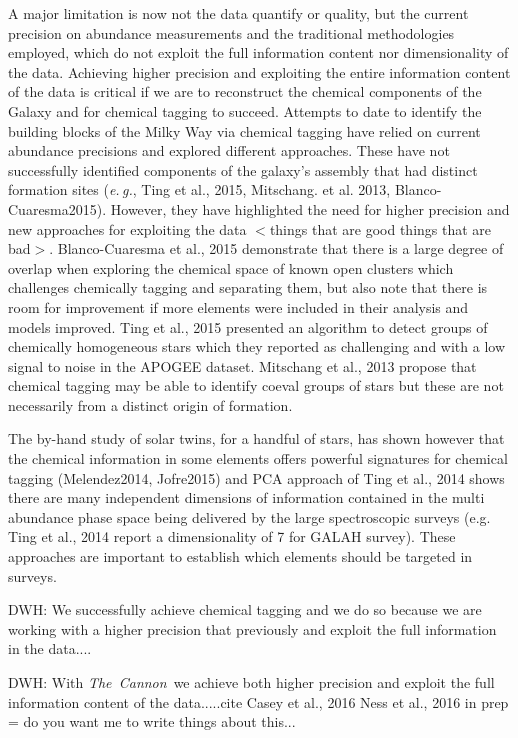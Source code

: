 \documentclass[12pt, letterpaper, preprint]{aastex}
\newcommand{\project}[1]{\textsl{#1}}
\newcommand{\thecannon}{\project{The~Cannon}}
\newcommand{\foreign}[1]{\textsl{#1}}
\newcommand{\eg}{\foreign{e.\,g.}}
\begin{document}
A major limitation is now not the data quantify or quality, but the
current precision on abundance measurements \citep[\eg,][]{Ting2015,
  Martel2015} and the traditional methodologies employed, which do not
exploit the full information content nor dimensionality of the
data.
Achieving higher precision and exploiting the entire information
content of the data is critical if we are to reconstruct the chemical
components of the Galaxy and for chemical tagging to succeed.
Attempts to date to identify the building blocks of the Milky Way via
chemical tagging have relied on current abundance precisions and
explored different approaches.
These have not successfully identified components of the galaxy's
assembly that had distinct formation sites (\eg, Ting et al., 2015, Mitschang. et al. 2013,
Blanco-Cuaresma2015).
However, they have highlighted the need for higher precision and new
approaches for exploiting the data $<$things that are good things that
are bad$>$.
Blanco-Cuaresma et al., 2015 demonstrate that there is a large degree
of overlap when exploring the chemical space of known open clusters
which challenges chemically tagging and separating them, but also note
that there is room for improvement if more elements were included in
their analysis and models improved.
Ting et al., 2015 presented an algorithm to detect groups of
chemically homogeneous stars which they reported as challenging and
with a low signal to noise in the APOGEE dataset.
Mitschang et al., 2013 propose that chemical tagging may be able to
identify coeval groups of stars but these are not necessarily from a
distinct origin of formation.

The by-hand study of solar twins, for a handful of stars, has shown
however that the chemical information in some elements offers powerful
signatures for chemical tagging (Melendez2014, Jofre2015) and PCA
approach of Ting et al., 2014 shows there are many independent
dimensions of information contained in the multi abundance phase space
being delivered by the large spectroscopic surveys (e.g. Ting et al.,
2014 report a dimensionality of 7 for GALAH survey).
These approaches are important to establish which elements should be
targeted in surveys.

DWH:  We successfully achieve chemical tagging and we do so because we are
working with a higher precision that previously and exploit the full
information in the data....

DWH: With \thecannon\ we achieve both higher precision and exploit the full
information content of the data.....cite Casey et al., 2016 Ness et
al., 2016 in prep = do you want me to write things about this...
\end{document}
